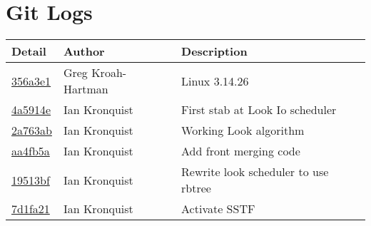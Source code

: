 \documentclass[10pt,conference,draftclsnofoot,onecolumn]{IEEEtran}
\begin{document}
\section{Git Logs}
\begin{tabular}{l l l}\textbf{Detail} & \textbf{Author} & \textbf{Description}\\
\hline
\href{git://git.yoctoproject.org/linux-yocto-3.14/commit/356a3e1fde11190febb8ace3cdab8694848ed220}{356a3e1} & Greg Kroah-Hartman & Linux 3.14.26\\\hline
\href{git://git.yoctoproject.org/linux-yocto-3.14/commit/4a5914ec16ba75f6d0ca454ebef6ef5bfe244f39}{4a5914e} & Ian Kronquist & First stab at Look Io scheduler\\\hline
\href{git://git.yoctoproject.org/linux-yocto-3.14/commit/2a763aba79ab22989d4a32a0c365919479a8cbe8}{2a763ab} & Ian Kronquist & Working Look algorithm\\\hline
\href{git://git.yoctoproject.org/linux-yocto-3.14/commit/aa4fb5ad6dfbd6f5e9984b47b5cbe315eda7831a}{aa4fb5a} & Ian Kronquist & Add front merging code\\\hline
\href{git://git.yoctoproject.org/linux-yocto-3.14/commit/19513bfbad0a7cc0d04c1b7ae783a96bdc98fe1e}{19513bf} & Ian Kronquist & Rewrite look scheduler to use rbtree\\\hline
\href{git://git.yoctoproject.org/linux-yocto-3.14/commit/7d1fa21a1e4dccf93fba9a1763da5303d97af390}{7d1fa21} & Ian Kronquist & Activate SSTF\\\hline
\end{tabular}


\clearpage
\printbibliography
\end{document}
